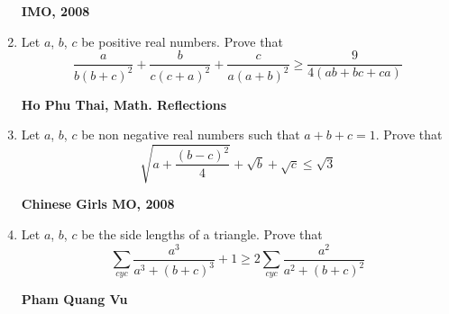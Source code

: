 \documentclass{article}
\begin{document}
\begin{enumerate}
\begin {enumerate}
      \end {enumerate}
\begin {flushright}
\textbf{IMO, 2008}
\end{flushright}
\item Let $a$, $b$, $c$ be positive real numbers. Prove that $$\frac {a}{b(b+c)^2}+\frac {b}{c (c+a)^2}+\frac {c}{a (a+b)^2} \geq \frac {9}{4 (ab+bc+ca)}$$
\begin {flushright}
\textbf{Ho Phu Thai, Math. Reflections}
\end{flushright}
\item Let $a$, $b$, $c$ be non negative real numbers such that $a+b+c=1$. Prove that $$\sqrt {a+\frac {(b-c)^2}{4}}+\sqrt {b}+\sqrt {c}\leq \sqrt {3}$$
\begin {flushright}
\textbf{Chinese Girls MO, 2008}
\end{flushright}
\item Let $a$, $b$, $c$ be the side lengths of a triangle. Prove that $$\sum \limits_{cyc} \frac {a^3}{a^3+(b+c)^3}+1\geq 2\sum \limits_{cyc}\frac {a^2}{a^2+(b+c)^2}$$
\begin {flushright}
\textbf{Pham Quang Vu}
\end{flushright}
\pagebreak


\end{enumerate}
\end{document}
